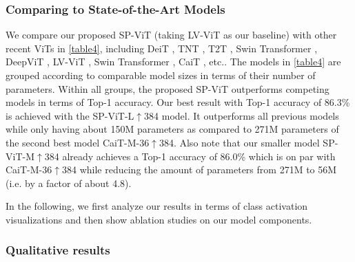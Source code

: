 \documentclass[authorversion, sigconf, acmthm=false, nonacm=true]{acmart}
\begin{document}
\subsubsection{Comparing to State-of-the-Art Models}
We compare our proposed SP-ViT (taking LV-ViT as our baseline) with other recent ViTs in \cref{table4},
including DeiT \cite{touvron2021training}, TNT \cite{han2021transformer}, T2T \cite{yuan2021tokens}, Swin Transformer \cite{liu2021swin}, DeepViT \cite{zhou2021deepvit},
LV-ViT \cite{jiang2021all}, Swin Transformer \cite{liu2021swin}, CaiT \cite{touvron2021going}, etc.. The models in \cref{table4} are grouped according to comparable model sizes in terms of their number of parameters. Within all groups, the proposed SP-ViT outperforms competing models in terms of Top-1 accuracy. Our best result with Top-1 accuracy of 86.3\% is achieved with the SP-ViT-L$\uparrow$384 model. It outperforms all previous models while only having about 150M parameters as compared to 271M parameters of the second best model CaiT-M-36$\uparrow$384. Also note that our smaller model SP-ViT-M$\uparrow$384 already achieves a Top-1 accuracy of 86.0\% which is on par with CaiT-M-36$\uparrow$384 while reducing the amount of parameters from 271M to 56M (i.e. by a factor of about 4.8). 

In the following, we first analyze our results in terms of class activation visualizations and then show ablation studies on our model components.











 
 





\subsubsection{Qualitative results}
\end{document}
